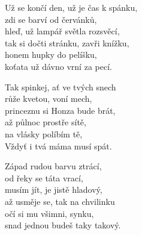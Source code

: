 
\ve{}
Už se končí den, už je čas k spánku,\\
zdi se barví od červánků,\\
hleď, už lampář světla rozsvěcí, \\
tak si dočti stránku, zavři knížku,\\
honem hupky do pelíšku,\\
koťata už dávno vrní za pecí. 

\cho{}
Tak spinkej, ať ve tvých snech\\
růže kvetou, voní mech,\\
princeznu si Honza bude brát, \\
až půlnoc prostře sítě,\\
na vlásky políbím tě,\\
Vždyť i tvá máma musí spát. 

\ve{}
Západ rudou barvu ztrácí,\\
od řeky se táta vrací,\\
musím jít, je jistě hladový,\\
až usměje se, tak na chvilinku\\
očí si mu všimni, synku,\\
snad jednou budeš taky takový.

\cho{}
\esong